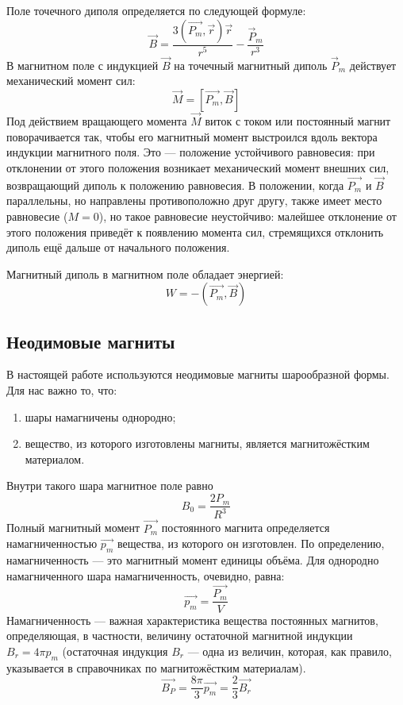\documentclass[a4paper, 12pt]{article}%
\begin{document}
Поле точечного диполя определяется по следующей формуле:
\begin{equation*}
\vec{B} = \dfrac{3\left(\vec{P_m}, \vec{r}\right)\vec{r}}{r^5} - \dfrac{\vec{P}_m}{r^3}
\end{equation*}
В магнитном поле с индукцией $\vec{B}$ на точечный магнитный диполь $\vec{P}_m$ действует механический момент сил:
\begin{equation*}
\vec{M} = \left[\vec{P_m}, \vec{B}\right]
\end{equation*}
Под действием вращающего момента $\vec{M}$ виток с током или постоянный магнит поворачивается так, чтобы его магнитный момент выстроился вдоль вектора индукции магнитного поля. Это --- положение устойчивого равновесия: при отклонении от этого положения возникает механический момент внешних сил, возвращающий диполь к положению равновесия. В положении, когда $\vec{P_m}$ и $\vec{B}$ параллельны, но направлены противоположно друг другу, также имеет место равновесие ($M = 0$), но такое равновесие неустойчиво: малейшее отклонение от этого положения приведёт к появлению момента сил, стремящихся отклонить диполь ещё дальше от начального положения.

Магнитный диполь в магнитном поле обладает энергией:
\begin{equation*}
W = -\left(\vec{P_m}, \vec{B}\right)
\end{equation*}
\subsection*{Неодимовые магниты}
В настоящей работе используются неодимовые магниты шарообразной формы.
Для нас важно то, что:
\begin{enumerate}
\item шары намагничены однородно;
\item вещество, из которого изготовлены магниты, является магнитожёстким материалом.
\end{enumerate}
Внутри такого шара магнитное поле равно 
\begin{equation}
B_0 = \dfrac{2P_m}{R^3}
\end{equation}
Полный магнитный момент $\vec{P_m}$ постоянного магнита определяется намагниченностью $\vec{p_m}$ вещества, из которого он изготовлен. По определению, намагниченность --- это магнитный момент единицы объёма. Для однородно намагниченного шара намагниченность, очевидно, равна:
\begin{equation}
\vec{p_m} = \dfrac{\vec{P_m}}{V}
\end{equation}
Намагниченность — важная характеристика вещества постоянных магнитов, определяющая, в частности, величину остаточной магнитной индукции $B_r = 4 \pi p_m$ (остаточная индукция $B_r$ --- одна из величин, которая, как правило, указывается в справочниках по магнитожёстким материалам).
\begin{equation}
\vec{B_P} = \dfrac{8\pi}{3}\vec{p_m} = \dfrac{2}{3} \vec{B_r}
\end{equation}
\end{document}
